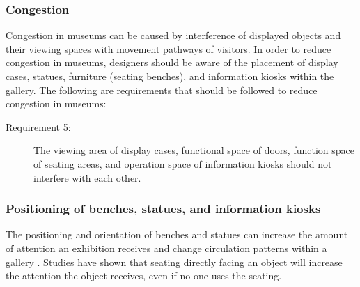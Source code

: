 \documentclass[12pt]{ucthesis}
\begin{document}
\begin{figure}[H]
\centering
{}
\hspace{10 mm}
\end{figure}


\subsubsection{Congestion}
Congestion in museums can be caused by interference of displayed objects and their viewing spaces with movement pathways of visitors. In order to reduce congestion in museums, designers should be aware of the placement of display cases, statues, furniture (seating benches), and information kiosks within the gallery. The following are requirements that should be followed to reduce congestion in museums:

\begin{description}
\item[Requirement 5:] The viewing area of display cases, functional space of doors, function space of seating areas, and operation space of information kiosks should not interfere with each other.
\end{description}

\subsubsection{Positioning of benches, statues, and information kiosks}
The positioning and orientation of benches and statues can increase the amount of attention an exhibition receives and change circulation patterns within a gallery \cite{Stavroulaki} \cite{Museum}. Studies have shown that seating directly facing an object will increase the attention the object receives, even if no one uses the seating. 
\end{document}
